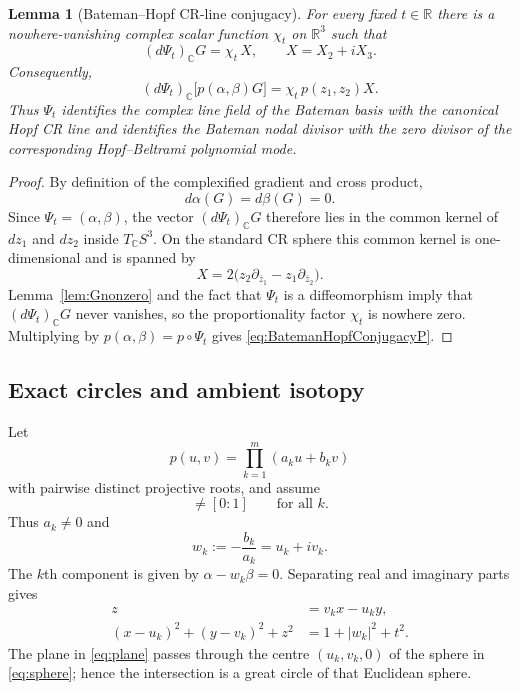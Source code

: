 \documentclass[aps,prd,reprint,nofootinbib,superscriptaddress]{revtex4-2}
\newtheorem{lemma}[theorem]{Lemma}
\theoremstyle{definition}
\theoremstyle{remark}
\begin{document}
\begin{lemma}[Bateman--Hopf CR-line conjugacy]
\label{lem:BatemanHopfConjugacy}
For every fixed $t\in\mathbb R$ there is a nowhere-vanishing complex scalar function $\chi_t$ on $\mathbb R^3$ such that
\begin{equation}
(d\Psi_t)_{\mathbb C}G=\chi_t\,X,
\qquad X=X_2+iX_3.
\label{eq:BatemanHopfConjugacy}
\end{equation}
Consequently,
\begin{equation}
(d\Psi_t)_{\mathbb C}\bigl[p(\alpha,\beta)G\bigr]
=\chi_t\,p(z_1,z_2)X.
\label{eq:BatemanHopfConjugacyP}
\end{equation}
Thus $\Psi_t$ identifies the complex line field of the Bateman basis with the canonical Hopf CR line and identifies the Bateman nodal divisor with the zero divisor of the corresponding Hopf--Beltrami polynomial mode.
\end{lemma}

\begin{proof}
By definition of the complexified gradient and cross product,
\[
 d\alpha(G)=d\beta(G)=0.
\]
Since $\Psi_t=(\alpha,\beta)$, the vector $(d\Psi_t)_{\mathbb C}G$ therefore lies in the common kernel of $dz_1$ and $dz_2$ inside $T_{\mathbb C}S^3$.  On the standard CR sphere this common kernel is one-dimensional and is spanned by
\[
X=2\bigl(z_2\partial_{\bar z_1}-z_1\partial_{\bar z_2}\bigr).
\]
Lemma~\ref{lem:Gnonzero} and the fact that $\Psi_t$ is a diffeomorphism imply that $(d\Psi_t)_{\mathbb C}G$ never vanishes, so the proportionality factor $\chi_t$ is nowhere zero.  Multiplying by $p(\alpha,\beta)=p\circ\Psi_t$ gives \eqref{eq:BatemanHopfConjugacyP}.
\end{proof}

\subsection{Exact circles and ambient isotopy}

Let
\begin{equation}
p(u,v)=\prod_{k=1}^m(a_ku+b_kv)
\label{eq:factorp}
\end{equation}
with pairwise distinct projective roots, and assume
\begin{equation}
[a_k:b_k]\ne[0:1]
\qquad\text{for all }k.
\label{eq:compactroots}
\end{equation}
Thus $a_k\ne0$ and
\begin{equation}
w_k:=-\frac{b_k}{a_k}=u_k+iv_k.
\label{eq:wk}
\end{equation}
The $k$th component is given by $\alpha-w_k\beta=0$. Separating real and imaginary parts gives
\begin{align}
z&=v_kx-u_ky,\label{eq:plane}\\
(x-u_k)^2+(y-v_k)^2+z^2
&=1+|w_k|^2+t^2.\label{eq:sphere}
\end{align}
The plane in \eqref{eq:plane} passes through the centre $(u_k,v_k,0)$ of the sphere in \eqref{eq:sphere}; hence the intersection is a great circle of that Euclidean sphere.
\end{document}
